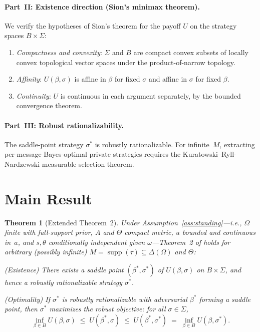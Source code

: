 \documentclass[11pt,a4paper]{article}
\newtheorem{theorem}{Theorem}[section]
\theoremstyle{definition}
\DeclareMathOperator{\supp}{supp}
\newcommand{\DeltaO}{\Delta(\Omega)}
\begin{document}
\paragraph{Part~II: Existence direction (Sion's minimax theorem).}
We verify the hypotheses of Sion's theorem for the payoff $U$ on the strategy spaces $B\times\Sigma$:
\begin{enumerate}[leftmargin=*]
  \item \emph{Compactness and convexity}: $\Sigma$ and $B$ are compact convex subsets of locally convex topological vector spaces under the product-of-narrow topology.
  \item \emph{Affinity}: $U(\beta,\sigma)$ is affine in $\beta$ for fixed $\sigma$ and affine in $\sigma$ for fixed $\beta$.
  \item \emph{Continuity}: $U$ is continuous in each argument separately, by the bounded convergence theorem.
\end{enumerate}

\paragraph{Part~III: Robust rationalizability.}
The saddle-point strategy $\sigma^*$ is robustly rationalizable.
For infinite~$M$, extracting per-message Bayes-optimal private strategies requires the Kuratowski--Ryll-Nardzewski measurable selection theorem.

\section{Main Result}
\label{sec:main}

\begin{theorem}[Extended Theorem~2]
\label{thm:main}
Under Assumption~\ref{ass:standing}---i.e., $\Omega$ finite with full-support prior, $A$ and $\Theta$ compact metric, $u$ bounded and continuous in~$a$, and $s,\theta$ conditionally independent given $\omega$---Theorem~2 of \citet{dworczak2026robust} holds for arbitrary (possibly infinite) $M = \supp(\tau) \subseteq \DeltaO$ and $\Theta$:

\textup{(Existence)} There exists a saddle point $(\beta^*,\sigma^*)$ of $U(\beta,\sigma)$ on $B\times\Sigma$, and hence a robustly rationalizable strategy $\sigma^*$.

\textup{(Optimality)} If $\sigma^*$ is robustly rationalizable with adversarial $\beta^*$ forming a saddle point, then $\sigma^*$ maximizes the robust objective: for all $\sigma\in\Sigma$,
\begin{equation}
\label{eq:main_ineq}
\inf_{\beta\in B} U(\beta,\sigma)
\;\le\; U(\beta^*,\sigma)
\;\le\; U(\beta^*,\sigma^*)
\;=\; \inf_{\beta\in B} U(\beta,\sigma^*).
\end{equation}
\end{theorem}
\end{document}
